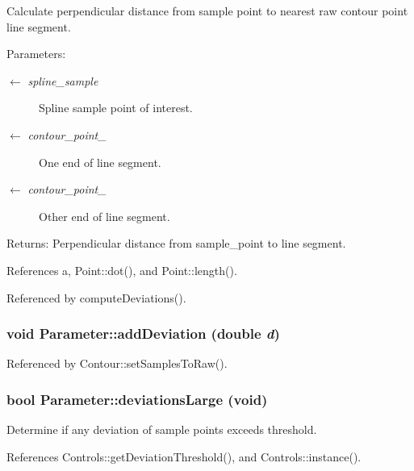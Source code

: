 Calculate perpendicular distance from sample point to nearest raw contour point line segment. \begin{Desc}
\item[Parameters:]
\begin{description}
\item[\mbox{$\leftarrow$} {\em spline\_\-sample}]Spline sample point of interest. \item[\mbox{$\leftarrow$} {\em contour\_\-point\_}]One end of line segment. \item[\mbox{$\leftarrow$} {\em contour\_\-point\_}]Other end of line segment. \end{description}
\end{Desc}
\begin{Desc}
\item[Returns:]Perpendicular distance from sample\_\-point to line segment. \end{Desc}


References a, Point::dot(), and Point::length().

Referenced by computeDeviations().\hypertarget{classParameter_ff6c2b408f89720293ec4db6ef186c3f}{
\subsubsection[addDeviation]{\setlength{\rightskip}{0pt plus 5cm}void Parameter::addDeviation (double {\em d})}}
\label{classParameter_ff6c2b408f89720293ec4db6ef186c3f}




Referenced by Contour::setSamplesToRaw().\hypertarget{classParameter_ec98b30f1dfebcb04e504adadb4a5787}{
\subsubsection[deviationsLarge]{\setlength{\rightskip}{0pt plus 5cm}bool Parameter::deviationsLarge (void)}}
\label{classParameter_ec98b30f1dfebcb04e504adadb4a5787}


Determine if any deviation of sample points exceeds threshold. 

References Controls::getDeviationThreshold(), and Controls::instance().

